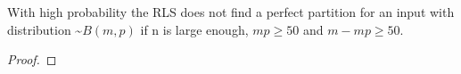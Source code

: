 \begin{lemma}\label{lemma:RLSBadBinomial}
    With high probability the RLS does not find a perfect partition for an input with distribution \textasciitilde$B(m,p)$ if n is large enough, $mp\ge50$ and $m-mp\ge50$.
\end{lemma}
\begin{proof}


\end{proof}
